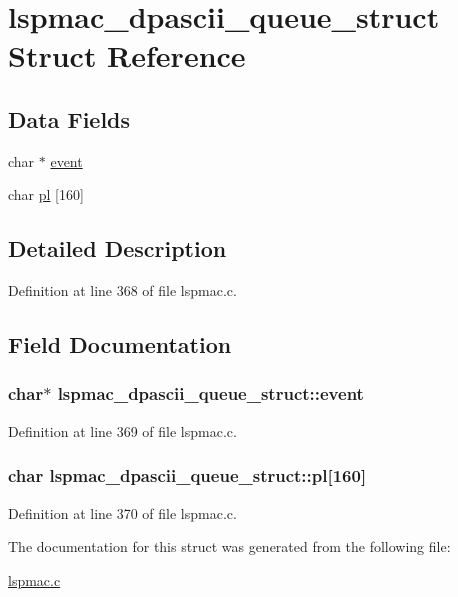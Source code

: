 \hypertarget{structlspmac__dpascii__queue__struct}{\section{lspmac\-\_\-dpascii\-\_\-queue\-\_\-struct Struct Reference}
\label{structlspmac__dpascii__queue__struct}
}
\subsection*{Data Fields}
\begin{DoxyCompactItemize}
\item 
char $\ast$ \hyperlink{structlspmac__dpascii__queue__struct_a8775c09713a917f4ddd80a3a5a8a4668}{event}
\item 
char \hyperlink{structlspmac__dpascii__queue__struct_a318d65317b14eba9e38efd0ab0133a5c}{pl} \mbox{[}160\mbox{]}
\end{DoxyCompactItemize}


\subsection{Detailed Description}


Definition at line 368 of file lspmac.\-c.



\subsection{Field Documentation}
\hypertarget{structlspmac__dpascii__queue__struct_a8775c09713a917f4ddd80a3a5a8a4668}{
\subsubsection[{event}]{\setlength{\rightskip}{0pt plus 5cm}char$\ast$ lspmac\-\_\-dpascii\-\_\-queue\-\_\-struct\-::event}}\label{structlspmac__dpascii__queue__struct_a8775c09713a917f4ddd80a3a5a8a4668}


Definition at line 369 of file lspmac.\-c.

\hypertarget{structlspmac__dpascii__queue__struct_a318d65317b14eba9e38efd0ab0133a5c}{
\subsubsection[{pl}]{\setlength{\rightskip}{0pt plus 5cm}char lspmac\-\_\-dpascii\-\_\-queue\-\_\-struct\-::pl\mbox{[}160\mbox{]}}}\label{structlspmac__dpascii__queue__struct_a318d65317b14eba9e38efd0ab0133a5c}


Definition at line 370 of file lspmac.\-c.



The documentation for this struct was generated from the following file\-:\begin{DoxyCompactItemize}
\item 
\hyperlink{lspmac_8c}{lspmac.\-c}\end{DoxyCompactItemize}
